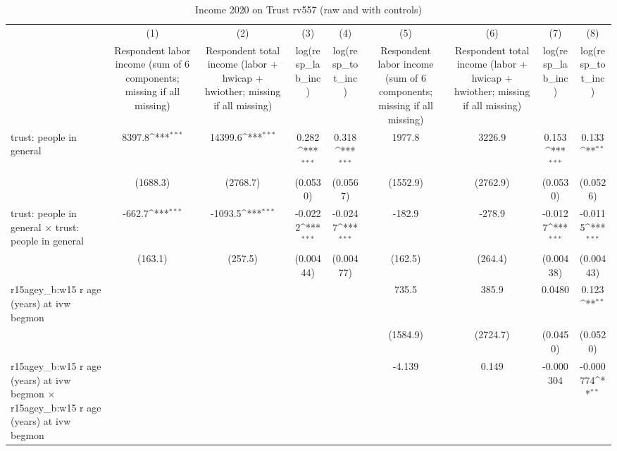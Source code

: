 \begin{table}[htbp]\centering
\def\sym#1{\ifmmode^{#1}\else\(^{#1}\)\fi}
\caption{Income 2020 on Trust rv557 (raw and with controls)}
\begin{tabular}{l*{8}{c}}
\toprule
                &\multicolumn{1}{c}{(1)}&\multicolumn{1}{c}{(2)}&\multicolumn{1}{c}{(3)}&\multicolumn{1}{c}{(4)}&\multicolumn{1}{c}{(5)}&\multicolumn{1}{c}{(6)}&\multicolumn{1}{c}{(7)}&\multicolumn{1}{c}{(8)}\\
                &\multicolumn{1}{c}{Respondent labor income (sum of 6 components; missing if all missing)}&\multicolumn{1}{c}{Respondent total income (labor + hwicap + hwiother; missing if all missing)}&\multicolumn{1}{c}{log(resp\_lab\_inc)}&\multicolumn{1}{c}{log(resp\_tot\_inc)}&\multicolumn{1}{c}{Respondent labor income (sum of 6 components; missing if all missing)}&\multicolumn{1}{c}{Respondent total income (labor + hwicap + hwiother; missing if all missing)}&\multicolumn{1}{c}{log(resp\_lab\_inc)}&\multicolumn{1}{c}{log(resp\_tot\_inc)}\\
\midrule
trust: people in general&   8397.8\sym{***}&  14399.6\sym{***}&    0.282\sym{***}&    0.318\sym{***}&   1977.8         &   3226.9         &    0.153\sym{***}&    0.133\sym{**} \\
                & (1688.3)         & (2768.7)         & (0.0530)         & (0.0567)         & (1552.9)         & (2762.9)         & (0.0530)         & (0.0526)         \\
\addlinespace
trust: people in general $\times$ trust: people in general&   -662.7\sym{***}&  -1093.5\sym{***}&  -0.0222\sym{***}&  -0.0247\sym{***}&   -182.9         &   -278.9         &  -0.0127\sym{***}&  -0.0115\sym{***}\\
                &  (163.1)         &  (257.5)         &(0.00444)         &(0.00477)         &  (162.5)         &  (264.4)         &(0.00438)         &(0.00443)         \\
\addlinespace
r15agey\_b:w15 r age (years) at ivw begmon&                  &                  &                  &                  &    735.5         &    385.9         &   0.0480         &    0.123\sym{**} \\
                &                  &                  &                  &                  & (1584.9)         & (2724.7)         & (0.0450)         & (0.0520)         \\
\addlinespace
r15agey\_b:w15 r age (years) at ivw begmon $\times$ r15agey\_b:w15 r age (years) at ivw begmon&                  &                  &                  &                  &   -4.139         &    0.149         &-0.000304         &-0.000774\sym{**} \\

\end{tabular}
\end{table}
